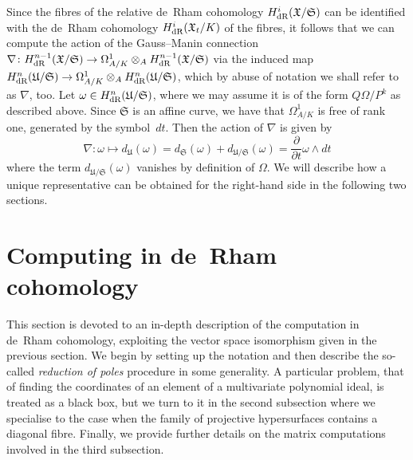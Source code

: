 Since the fibres of the relative de~Rham cohomology 
$H_{\text{dR}}^i(\mathfrak{X}/\mathfrak{S})$ can be identified with the de~Rham 
cohomology $H_{\text{dR}}^i(\mathfrak{X}_t/K)$ of the fibres, it 
follows that we can compute the action of the Gauss--Manin connection 
$\nabla \colon H_{\text{dR}}^{n-1}(\mathfrak{X}/\mathfrak{S}) \rightarrow 
\Omega_{A/K}^1 \otimes_{A} H_{\text{dR}}^{n-1}(\mathfrak{X}/\mathfrak{S})$
via the induced map 
$H_{\text{dR}}^n(\mathfrak{U}/\mathfrak{S}) \rightarrow 
\Omega_{A/K}^1 \otimes_{A} H_{\text{dR}}^n(\mathfrak{U}/\mathfrak{S})$, 
which by abuse of notation we shall refer to as $\nabla$, too.  
Let $\omega \in H_{\text{dR}}^{n}(\mathfrak{U}/\mathfrak{S})$, where we may 
assume it is of the form $Q \Omega / P^k$ as described above.  Since 
$\mathfrak{S}$ is an affine curve, we have that $\Omega_{A/K}^1$ is 
free of rank one, generated by the symbol~$dt$.  Then the action of 
$\nabla$ is given by 
\begin{equation}
\nabla \colon \omega \mapsto d_{\mathfrak{U}}(\omega) = 
    d_{\mathfrak{S}}(\omega) + d_{\mathfrak{U}/\mathfrak{S}}(\omega) = 
    \frac{\partial}{\partial t} \omega \wedge dt
\end{equation}
where the term $d_{\mathfrak{U}/\mathfrak{S}}(\omega)$ vanishes by 
definition of $\Omega$.  We will describe how a unique representative 
can be obtained for the right-hand side in the following two sections.


\section{Computing in de~{R}ham cohomology}

This section is devoted to an in-depth description of the computation in 
de~Rham cohomology, exploiting the vector space isomorphism given in 
the previous section.  We begin by setting up the notation and then describe 
the so-called \emph{reduction of poles} procedure in some generality.  
A particular problem, that of finding the coordinates of an element of a 
multivariate polynomial ideal, is treated as a black box, but we turn to it 
in the second subsection where we specialise to the case when the family of 
projective hypersurfaces contains a diagonal fibre.  Finally, we provide 
further details on the matrix computations involved in the third subsection.


